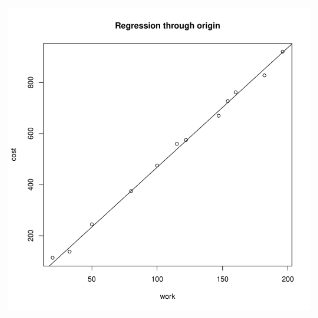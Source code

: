 \documentclass{article}\usepackage[]{graphicx}\usepackage[]{color}
\newenvironment{knitrout}{}{} %
\begin{document}
\begin{knitrout}
{\centering \includegraphics[width=0.6\textwidth]{figure/unnamed-chunk-4-1} 

}



\end{knitrout}
\end{document}
